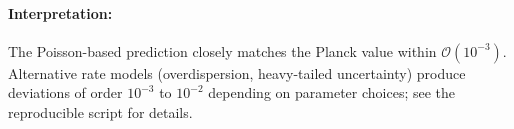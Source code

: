 \paragraph{Interpretation:}
The Poisson-based prediction closely matches the Planck value within \(\mathcal{O}(10^{-3})\).
Alternative rate models (overdispersion, heavy-tailed uncertainty) produce deviations of order
\(10^{-3}\) to \(10^{-2}\) depending on parameter choices; see the reproducible script for details.

